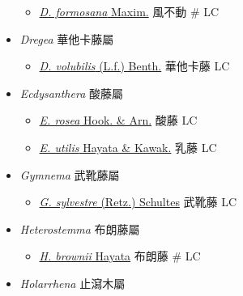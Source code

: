 \begin{itemize}
  \begin{itemize}
        \item[] \href{http://www.theplantlist.org/tpl1.1/search?q=Dischidia+formosana}{\textit{D. formosana} Maxim.}   風不動  \# LC
  \end{itemize}
 \item[] \textit{Dregea} 華他卡藤屬
                                
  \begin{itemize}
        \item[] \href{http://www.theplantlist.org/tpl1.1/search?q=Dregea+volubilis}{\textit{D. volubilis} (L.f.) Benth.}   華他卡藤   LC
  \end{itemize}
 \item[] \textit{Ecdysanthera} 酸藤屬
                                
  \begin{itemize}
        \item[] \href{http://www.theplantlist.org/tpl1.1/search?q=Ecdysanthera+rosea}{\textit{E. rosea} Hook. \& Arn.}   酸藤   LC
        \item[] \href{http://www.theplantlist.org/tpl1.1/search?q=Ecdysanthera+utilis}{\textit{E. utilis} Hayata \& Kawak.}   乳藤   LC
  \end{itemize}
 \item[] \textit{Gymnema} 武靴藤屬
                                
  \begin{itemize}
        \item[] \href{http://www.theplantlist.org/tpl1.1/search?q=Gymnema+sylvestre}{\textit{G. sylvestre} (Retz.) Schultes}   武靴藤   LC
  \end{itemize}
 \item[] \textit{Heterostemma} 布朗藤屬
                                
  \begin{itemize}
        \item[] \href{http://www.theplantlist.org/tpl1.1/search?q=Heterostemma+brownii}{\textit{H. brownii} Hayata}   布朗藤  \# LC
  \end{itemize}
 \item[] \textit{Holarrhena} 止瀉木屬
                                

\end{itemize}
